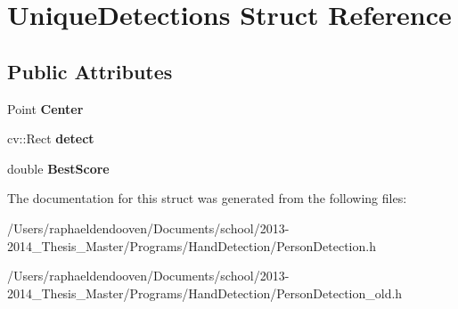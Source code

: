 \hypertarget{struct_unique_detections}{\section{Unique\-Detections Struct Reference}
\label{struct_unique_detections}
}
\subsection*{Public Attributes}
\begin{DoxyCompactItemize}
\item 
\hypertarget{struct_unique_detections_ac04402d436abbee621deaf288a37aafb}{Point {\bfseries Center}}\label{struct_unique_detections_ac04402d436abbee621deaf288a37aafb}

\item 
\hypertarget{struct_unique_detections_a4d357431d7d4605368ac6159b6b91ab4}{cv\-::\-Rect {\bfseries detect}}\label{struct_unique_detections_a4d357431d7d4605368ac6159b6b91ab4}

\item 
\hypertarget{struct_unique_detections_aa39618ff58f2f18dab9f8f0c36bffcae}{double {\bfseries Best\-Score}}\label{struct_unique_detections_aa39618ff58f2f18dab9f8f0c36bffcae}

\end{DoxyCompactItemize}


The documentation for this struct was generated from the following files\-:\begin{DoxyCompactItemize}
\item 
/\-Users/raphaeldendooven/\-Documents/school/2013-\/2014\-\_\-\-Thesis\-\_\-\-Master/\-Programs/\-Hand\-Detection/Person\-Detection.\-h\item 
/\-Users/raphaeldendooven/\-Documents/school/2013-\/2014\-\_\-\-Thesis\-\_\-\-Master/\-Programs/\-Hand\-Detection/Person\-Detection\-\_\-old.\-h\end{DoxyCompactItemize}
